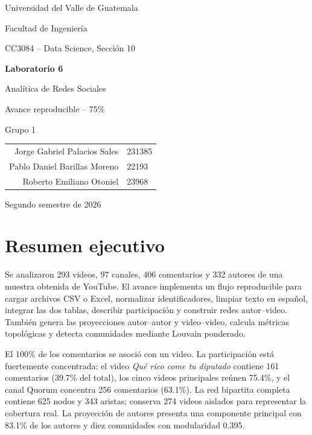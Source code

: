 \documentclass[11pt]{article}
\begin{document}
\begin{titlepage}
\pagecolor{navy}\color{white}
\centering
\vspace*{1.4cm}
{\Large Universidad del Valle de Guatemala\par}
\vspace{0.4cm}
{\large Facultad de Ingeniería\par}
{\large CC3084 -- Data Science, Sección 10\par}
\vfill
{\Huge\bfseries Laboratorio 6\par}
\vspace{0.3cm}
{\LARGE Analítica de Redes Sociales\par}
\vspace{0.9cm}
{\Large\color{teal!25!white}Avance reproducible -- 75\%\par}
\vfill
{\large Grupo 1\par}
\vspace{0.5cm}
\begin{tabular}{rl}
Jorge Gabriel Palacios Sales & 231385\\
Pablo Daniel Barillas Moreno & 22193\\
Roberto Emiliano Otoniel & 23968\\
\end{tabular}
\vfill
{\large Segundo semestre de 2026\par}
\end{titlepage}
\nopagecolor\color{black}

\tableofcontents
\newpage

\section{Resumen ejecutivo}

Se analizaron 293 videos, 97 canales, 406 comentarios y 332 autores de una muestra obtenida de YouTube. El avance implementa un flujo reproducible para cargar archivos CSV o Excel, normalizar identificadores, limpiar texto en español, integrar las dos tablas, describir participación y construir redes autor--video. También genera las proyecciones autor--autor y video--video, calcula métricas topológicas y detecta comunidades mediante Louvain ponderado.

El 100\% de los comentarios se asoció con un video. La participación está fuertemente concentrada: el video \emph{Qué rico come tu diputado} contiene 161 comentarios (39.7\% del total), los cinco videos principales reúnen 75.4\%, y el canal Quorum concentra 256 comentarios (63.1\%). La red bipartita completa contiene 625 nodos y 343 aristas; conserva 274 videos aislados para representar la cobertura real. La proyección de autores presenta una componente principal con 83.1\% de los autores y diez comunidades con modularidad 0.395.
\end{document}
